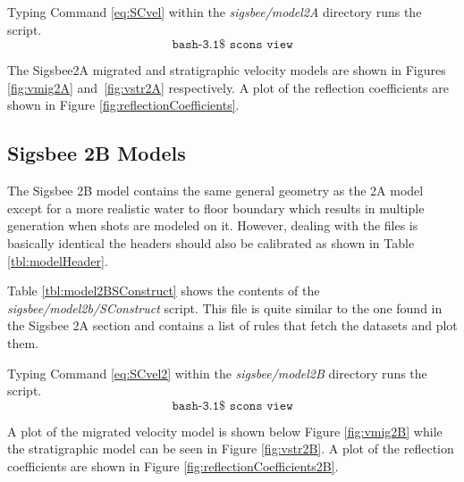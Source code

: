 {
\tiny

\normalsize
}

Typing Command \ref{eq:SCvel} within the \emph{sigsbee/model2A} directory runs the script.
\begin{equation}\label{eq:SCvel} \texttt{bash-3.1\$\ scons\ view} \end{equation}

The Sigsbee2A migrated and stratigraphic velocity models are shown in Figures \ref{fig:vmig2A} and~\ref{fig:vstr2A} respectively.  
A plot of the reflection coefficients are shown in Figure \ref{fig:reflectionCoefficients}.  


\subsection{Sigsbee 2B Models}
The Sigsbee 2B model contains the same general geometry as the 2A model except for a more realistic water to floor boundary which 
results in multiple generation when shots are modeled on it.  However, dealing with the files is basically identical the headers should 
also be calibrated as shown in Table \ref{tbl:modelHeader}. 

Table \ref{tbl:model2BSConstruct} shows the contents of the \emph{sigsbee/model2b/SConstruct} script.  This file is quite similar to 
the one found in the Sigsbee 2A section and contains a list of rules that fetch the datasets and plot them.  

{
\tiny

\normalsize
}

Typing Command \ref{eq:SCvel2} within the \emph{sigsbee/model2B} directory runs the script.
\begin{equation}\label{eq:SCvel2} \texttt{bash-3.1\$\ scons\ view} \end{equation}
 
A plot of the migrated velocity model is shown below Figure \ref{fig:vmig2B} while the stratigraphic model can be seen 
in Figure \ref{fig:vstr2B}.  A plot of the reflection coefficients are shown in Figure \ref{fig:reflectionCoefficients2B}.


